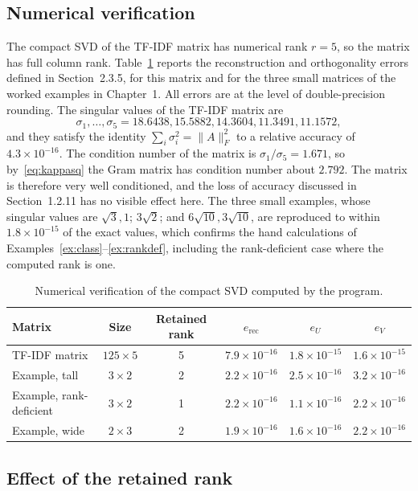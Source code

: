 \documentclass[12pt,a4paper]{report}
\newcommand{\norm}[1]{\lVert #1\rVert}
\theoremstyle{plain}
\theoremstyle{definition}
\theoremstyle{remark}
\theoremstyle{definition}
\begin{document}
\subsection{Numerical verification}

The compact SVD of the TF-IDF matrix has numerical rank $r=5$, so the matrix has full column rank. Table~\ref{tab:verify} reports the reconstruction and orthogonality errors defined in Section~2.3.5, for this matrix and for the three small matrices of the worked examples in Chapter~1. All errors are at the level of double-precision rounding. The singular values of the TF-IDF matrix are
\[
\sigma_1,\dots,\sigma_5=18.6438, 15.5882, 14.3604, 11.3491, 11.1572,
\]
and they satisfy the identity $\sum_i\sigma_i^2=\norm{A}_F^2$ to a relative accuracy of $4.3\times10^{-16}$. The condition number of the matrix is $\sigma_1/\sigma_5=1.671$, so by~\eqref{eq:kappasq} the Gram matrix has condition number about $2.792$. The matrix is therefore very well conditioned, and the loss of accuracy discussed in Section~1.2.11 has no visible effect here. The three small examples, whose singular values are $\sqrt3,1$; $3\sqrt2$; and $6\sqrt{10},3\sqrt{10}$, are reproduced to within $1.8\times10^{-15}$ of the exact values, which confirms the hand calculations of Examples~\ref{ex:class}--\ref{ex:rankdef}, including the rank-deficient case where the computed rank is one.

\begin{table}[H]
\centering
\caption{Numerical verification of the compact SVD computed by the program.}\label{tab:verify}
\small\begin{tabular}{@{}lccccc@{}}
\toprule
Matrix & Size & Retained rank & $e_{\mathrm{rec}}$ & $e_U$ & $e_V$\\
\midrule
TF-IDF matrix & $125\times5$ & 5 & $7.9\times10^{-16}$ & $1.8\times10^{-15}$ & $1.6\times10^{-15}$\\
Example, tall & $3\times2$ & 2 & $2.2\times10^{-16}$ & $2.5\times10^{-16}$ & $3.2\times10^{-16}$\\
Example, rank-deficient & $3\times2$ & 1 & $2.2\times10^{-16}$ & $1.1\times10^{-16}$ & $2.2\times10^{-16}$\\
Example, wide & $2\times3$ & 2 & $1.9\times10^{-16}$ & $1.6\times10^{-16}$ & $2.2\times10^{-16}$\\
\bottomrule
\end{tabular}
\end{table}

\subsection{Effect of the retained rank}
\end{document}
